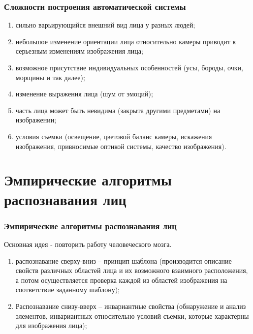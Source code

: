 \documentclass{beamer}
\begin{document}

\begin{frame}
\frametitle{Сложности построения автоматической системы}

\begin{enumerate}
\item сильно варьирующийся внешний вид лица у разных людей;
\item небольшое изменение ориентации лица относительно камеры приводит к серьезным изменениям изображения лица;
\item возможное присутствие индивидуальных особенностей (усы, бороды, очки, морщины и так далее);
\item изменение выражения лица (шум от эмоций);
\item часть лица может быть невидима (закрыта другими предметами) на изображении;
\item условия съемки (освещение, цветовой баланс камеры, искажения изображения, привносимые оптикой системы, качество изображения). 
\end{enumerate}
\end{frame}

\section{Эмпирические алгоритмы распознавания лиц}

\begin{frame}
\frametitle{Эмпирические алгоритмы распознавания лиц}

Основная идея - повторить работу человеческого мозга.

\begin{enumerate}
\item распознавание сверху-вниз -- принцип шаблона (производится описание свойств различных областей лица и их возможного взаимного расположения, а потом осуществляется проверка каждой из областей изображения на соответствие заданному шаблону);
\item Распознавание снизу-вверх -- инвариантные свойства (обнаружение и анализ элементов, инвариантных относительно условий съемки, которые характерны для изображения лица);
\end{enumerate}

\end{frame}

\end{document}

